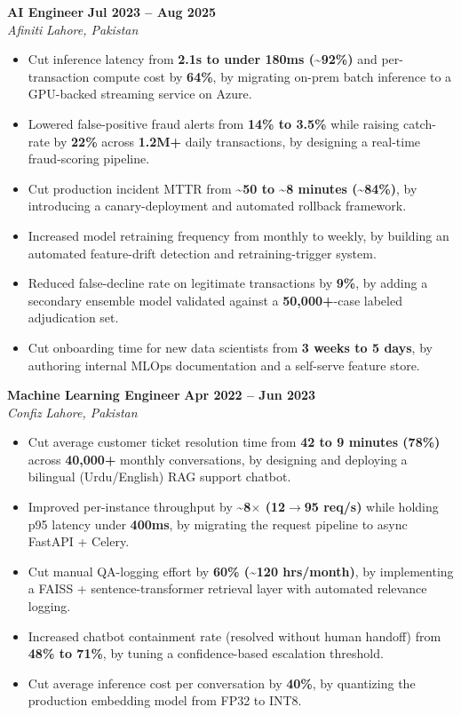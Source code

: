 \documentclass[10.5pt,letterpaper]{article}
\newcommand{\jobheader}[4]{%
  \textbf{#1} \hfill \textbf{#2}\\
  \textit{#3} \hfill \textit{#4}%
}
\begin{document}
\vspace{6pt}
\jobheader{AI Engineer}{Jul 2023 -- Aug 2025}{Afiniti}{Lahore, Pakistan}
\begin{itemize}
  \item Cut inference latency from \textbf{2.1s to under 180ms (\textasciitilde92\%)} and per-transaction compute cost by \textbf{64\%}, by migrating on-prem batch inference to a GPU-backed streaming service on Azure.
  \item Lowered false-positive fraud alerts from \textbf{14\% to 3.5\%} while raising catch-rate by \textbf{22\%} across \textbf{1.2M+} daily transactions, by designing a real-time fraud-scoring pipeline.
  \item Cut production incident MTTR from \textbf{\textasciitilde50 to \textasciitilde8 minutes (\textasciitilde84\%)}, by introducing a canary-deployment and automated rollback framework.
  \item Increased model retraining frequency from monthly to weekly, by building an automated feature-drift detection and retraining-trigger system.
  \item Reduced false-decline rate on legitimate transactions by \textbf{9\%}, by adding a secondary ensemble model validated against a \textbf{50,000+}-case labeled adjudication set.
  \item Cut onboarding time for new data scientists from \textbf{3 weeks to 5 days}, by authoring internal MLOps documentation and a self-serve feature store.
\end{itemize}

\vspace{6pt}
\jobheader{Machine Learning Engineer}{Apr 2022 -- Jun 2023}{Confiz}{Lahore, Pakistan}
\begin{itemize}
  \item Cut average customer ticket resolution time from \textbf{42 to 9 minutes (78\%)} across \textbf{40,000+} monthly conversations, by designing and deploying a bilingual (Urdu/English) RAG support chatbot.
  \item Improved per-instance throughput by \textbf{\textasciitilde8$\times$ (12$\rightarrow$95 req/s)} while holding p95 latency under \textbf{400ms}, by migrating the request pipeline to async FastAPI + Celery.
  \item Cut manual QA-logging effort by \textbf{60\% (\textasciitilde120 hrs/month)}, by implementing a FAISS + sentence-transformer retrieval layer with automated relevance logging.
  \item Increased chatbot containment rate (resolved without human handoff) from \textbf{48\% to 71\%}, by tuning a confidence-based escalation threshold.
  \item Cut average inference cost per conversation by \textbf{40\%}, by quantizing the production embedding model from FP32 to INT8.
\end{itemize}
\end{document}

